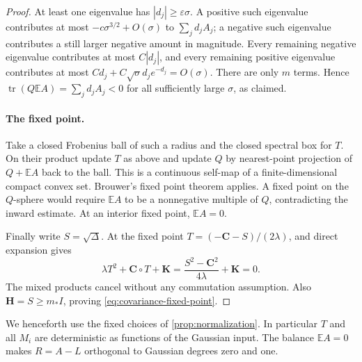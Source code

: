 \begin{proof}
At least one eigenvalue has $|d_j|\ge\varepsilon\sigma$. A positive such eigenvalue contributes at most $-c\sigma^{3/2}+O(\sigma)$ to $\sum_jd_jA_j$; a negative such eigenvalue contributes a still larger negative amount in magnitude. Every remaining negative eigenvalue contributes at most $C|d_j|$, and every remaining positive eigenvalue contributes at most $Cd_j+C\sqrt\sigma d_je^{-d_j}=O(\sigma)$. There are only $m$ terms. Hence $\operatorname{tr}(Q\mathbb{E}A)=\sum_jd_jA_j<0$ for all sufficiently large $\sigma$, as claimed.

\paragraph{The fixed point.}
Take a closed Frobenius ball of such a radius and the closed spectral box for $T$. On their product update $T$ as above and update $Q$ by nearest-point projection of $Q+\mathbb{E}A$ back to the ball. This is a continuous self-map of a finite-dimensional compact convex set. Brouwer's fixed point theorem \cite{Brouwer1911} applies. A fixed point on the $Q$-sphere would require $\mathbb{E}A$ to be a nonnegative multiple of $Q$, contradicting the inward estimate. At an interior fixed point, $\mathbb{E}A=0$.

Finally write $S=\sqrt\Delta$. At the fixed point $T=(-\mathbf{C}-S)/(2\lambda)$, and direct expansion gives
\[
\lambda T^2+\mathbf{C}\circ T+\mathbf{K}
=\frac{S^2-\mathbf{C}^2}{4\lambda}+\mathbf{K}=0.
\]
The mixed products cancel without any commutation assumption. Also $\mathbf{H}=S\ge m_*I$, proving \eqref{eq:covariance-fixed-point}.
\end{proof}

We henceforth use the fixed choices of \cref{prop:normalization}. In particular $T$ and all $M_i$ are deterministic as functions of the Gaussian input. The balance $\mathbb{E}A=0$ makes $R=A-L$ orthogonal to Gaussian degrees zero and one.
